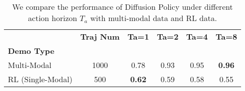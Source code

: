 \begin{table}[t]
\caption{
   We compare the performance of Diffusion Policy under different action horizon $T_a$ with multi-modal data and RL data.
}
\label{table:exp_dp_demo_types}
\setlength{\tabcolsep}{3.5pt}
\begin{center}
    {
        {%
\begin{tabular}{l c c c c c}
\toprule[1pt]
& \textbf{Traj Num}
& \textbf{Ta=1}
& \textbf{Ta=2}
& \textbf{Ta=4}
& \textbf{Ta=8}
\\
\textbf{Demo Type}
&
&
&
\\
\midrule
Multi-Modal
& 1000
& 0.78
& 0.93
& 0.95
& \textbf{0.96}
\\
RL (Single-Modal)
& 500
& \textbf{0.62}
& 0.59
& 0.58
& 0.55
\\
\bottomrule[1pt]
\end{tabular}
        }%
    }
\end{center}
\end{table}
